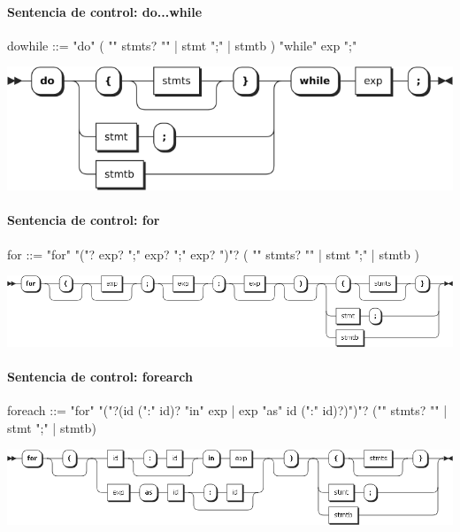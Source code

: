 \paragraph{Sentencia de control: do...while}
\begin{myverbatim}
dowhile ::=  "do" ( "{" stmts? "}" | stmt ";" | stmtb ) "while" exp ";"
\end{myverbatim}  	
\begin{center}
\includegraphics[scale=0.5]{diagram/dowhile.png} \\
\end{center}

\paragraph{Sentencia de control: for}
\begin{myverbatim}
for ::= "for" "("? exp? ";" exp? ";" exp? ")"? ( "{" stmts? "}" | stmt ";" | stmtb )
\end{myverbatim}  	
\begin{center}
\includegraphics[scale=0.4]{diagram/for.png} \\
\end{center}
\paragraph{Sentencia de control: forearch}
\begin{myverbatim}[style=nonumbers,basicstyle=\tiny]
foreach ::= 
   "for" "("?(id (":" id)? "in" exp | exp "as" id (":" id)?)")"? ("{" stmts? "}" | stmt ";" | stmtb)
\end{myverbatim}  	
\begin{center}
\includegraphics[scale=0.4]{diagram/foreach.png} \\
\end{center}
\pagebreak
